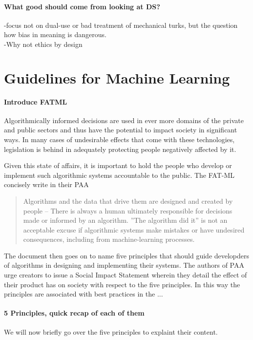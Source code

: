 \documentclass{article}
\begin{document}
\paragraph{What good should come from looking at DS?}
-focus not on dual-use or bad treatment of mechanical turks, but the question how bias in meaning is dangerous.\\
-Why not ethics by design
\section{Guidelines for Machine Learning}\hypertarget{sec2}{}
\paragraph{Introduce FATML}
Algorithmically informed decisions are used in ever more domains of the private and public sectors and thus have the potential to impact society in significant ways. In many cases of undesirable effects that come with these technologies, legislation is behind in adequately protecting people negatively affected by it.

Given this state of affairs, it is important to hold the people who develop or implement such algorithmic systems accountable to the public. The FAT-ML concisely write in their PAA \cite{principles}
\begin{quote}
Algorithms and the data that drive them are designed and created by people -- There is always a human ultimately responsible for decisions made or informed by an algorithm. ''The algorithm did it'' is not an acceptable excuse if algorithmic systems make mistakes or have undesired consequences, including from machine-learning processes.
\end{quote}

The document then goes on to name five principles that should guide developders of algorithms in designing and implementing their systems. The authors of PAA urge creators to issue a Social Impact Statement wherein they detail the effect of their product has on society with respect to the five principles. In this way the principles are associated with best practices in the ...

\paragraph{5 Principles, quick recap of each of them}

We will now briefly go over the five principles to explaint their content.
\end{document}
